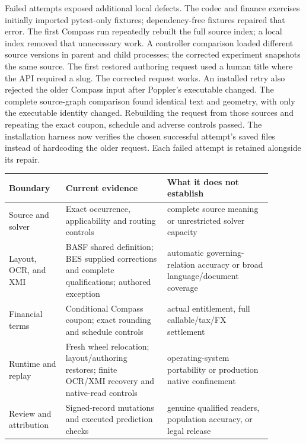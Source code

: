 Failed attempts exposed additional local defects.  The codec and finance
exercises initially imported pytest-only fixtures; dependency-free fixtures
repaired that error.  The first Compass run repeatedly rebuilt the full source
index; a local index removed that unnecessary work.  A controller comparison
loaded different source versions in parent and child processes; the corrected
experiment snapshots the same source.  The first restored authoring request
used a human title where the API required a slug.  The corrected request works.
An installed retry also rejected the older Compass input after Poppler's
executable changed.  The complete source-graph comparison found identical text
and geometry, with only the executable identity changed.  Rebuilding the
request from those sources and repeating the exact coupon, schedule and adverse
controls passed.  The installation harness now verifies the chosen successful
attempt's saved files instead of hardcoding the older request.
Each failed attempt is retained alongside its repair.

\begin{center}
\small
\begin{tabular}{>{\raggedright\arraybackslash}p{0.19\linewidth}>{\raggedright\arraybackslash}p{0.34\linewidth}>{\raggedright\arraybackslash}p{0.35\linewidth}}
\textbf{Boundary} & \textbf{Current evidence} & \textbf{What it does not establish}\\
\hline
Source and solver & Exact occurrence, applicability and routing controls & complete source meaning or unrestricted solver capacity\\
Layout, OCR, and XMI & BASF shared definition; BES supplied corrections and complete qualifications; authored exception & automatic governing-relation accuracy or broad language/document coverage\\
Financial terms & Conditional Compass coupon; exact rounding and schedule controls & actual entitlement, full callable/tax/FX settlement\\
Runtime and replay & Fresh wheel relocation; layout/authoring restores; finite OCR/XMI recovery and native-read controls & operating-system portability or production native confinement\\
Review and attribution & Signed-record mutations and executed prediction checks & genuine qualified readers, population accuracy, or legal release\\
\end{tabular}
\end{center}

